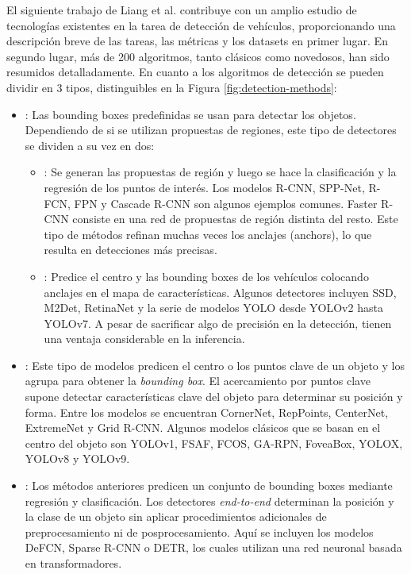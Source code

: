\documentclass[12pt,a4paper,onecolumn,oneside]{report}
\begin{document}
El siguiente trabajo de Liang et al. \cite{s24103088} contribuye con un amplio estudio de tecnologías existentes en la tarea de detección de vehículos, proporcionando una descripción breve de las tareas, las métricas y los datasets en primer lugar. En segundo lugar, más de 200 algoritmos, tanto clásicos como novedosos, han sido resumidos detalladamente. En cuanto a los algoritmos de detección se pueden dividir en 3 tipos, distinguibles en la Figura \ref{fig:detection-methods}:
\begin{itemize}[leftmargin=6.5em]
    \item[Anchor-based]: Las bounding boxes predefinidas se usan para detectar los objetos. Dependiendo de si se utilizan propuestas de regiones, este tipo de detectores se dividen a su vez en dos:
    \begin{itemize}
        \item[Two-stage]: Se generan las propuestas de región y luego se hace la clasificación y la regresión de los puntos de interés. Los modelos R-CNN, SPP-Net, R-FCN, FPN y Cascade R-CNN son algunos ejemplos comunes. Faster R-CNN consiste en una red de propuestas de región distinta del resto. Este tipo de métodos refinan muchas veces los anclajes (anchors), lo que resulta en detecciones más precisas.
        \item[One-stage]: Predice el centro y las bounding boxes de los vehículos colocando anclajes en el mapa de características. Algunos detectores incluyen SSD, M2Det, RetinaNet y la serie de modelos YOLO desde YOLOv2 hasta YOLOv7. A pesar de sacrificar algo de precisión en la detección, tienen una ventaja considerable en la inferencia.
    \end{itemize}
    \item[Anchor-free]: Este tipo de modelos predicen el centro o los puntos clave de un objeto y los agrupa para obtener la \textit{bounding box}. El acercamiento por puntos clave supone detectar características clave del objeto para determinar su posición y forma. Entre los modelos se encuentran CornerNet, RepPoints, CenterNet, ExtremeNet y Grid R-CNN. Algunos modelos clásicos que se basan en el centro del objeto son YOLOv1, FSAF, FCOS, GA-RPN, FoveaBox, YOLOX, YOLOv8 y YOLOv9.
    \item[End-to-end]: Los métodos anteriores predicen un conjunto de bounding boxes mediante regresión y clasificación. Los detectores \textit{end-to-end} determinan la posición y la clase de un objeto sin aplicar procedimientos adicionales de preprocesamiento ni de posprocesamiento. Aquí se incluyen los modelos DeFCN, Sparse R-CNN o DETR, los cuales utilizan una red neuronal basada en transformadores. 
\end{itemize}
\end{document}
